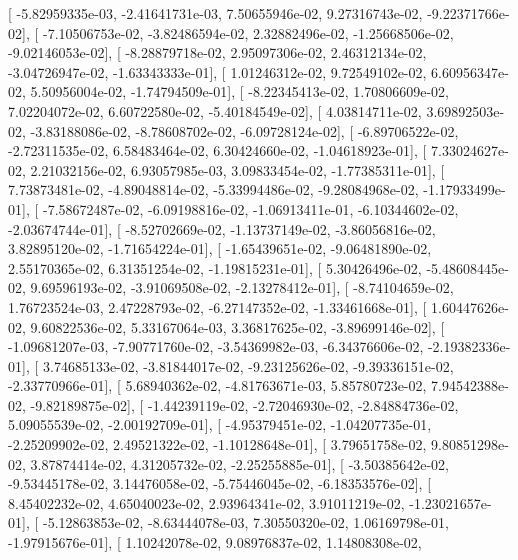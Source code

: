 \documentclass{article}
\begin{document}
       [ -5.82959335e-03,  -2.41641731e-03,   7.50655946e-02,
          9.27316743e-02,  -9.22371766e-02],
       [ -7.10506753e-02,  -3.82486594e-02,   2.32882496e-02,
         -1.25668506e-02,  -9.02146053e-02],
       [ -8.28879718e-02,   2.95097306e-02,   2.46312134e-02,
         -3.04726947e-02,  -1.63343333e-01],
       [  1.01246312e-02,   9.72549102e-02,   6.60956347e-02,
          5.50956004e-02,  -1.74794509e-01],
       [ -8.22345413e-02,   1.70806609e-02,   7.02204072e-02,
          6.60722580e-02,  -5.40184549e-02],
       [  4.03814711e-02,   3.69892503e-02,  -3.83188086e-02,
         -8.78608702e-02,  -6.09728124e-02],
       [ -6.89706522e-02,  -2.72311535e-02,   6.58483464e-02,
          6.30424660e-02,  -1.04618923e-01],
       [  7.33024627e-02,   2.21032156e-02,   6.93057985e-03,
          3.09833454e-02,  -1.77385311e-01],
       [  7.73873481e-02,  -4.89048814e-02,  -5.33994486e-02,
         -9.28084968e-02,  -1.17933499e-01],
       [ -7.58672487e-02,  -6.09198816e-02,  -1.06913411e-01,
         -6.10344602e-02,  -2.03674744e-01],
       [ -8.52702669e-02,  -1.13737149e-02,  -3.86056816e-02,
          3.82895120e-02,  -1.71654224e-01],
       [ -1.65439651e-02,  -9.06481890e-02,   2.55170365e-02,
          6.31351254e-02,  -1.19815231e-01],
       [  5.30426496e-02,  -5.48608445e-02,   9.69596193e-02,
         -3.91069508e-02,  -2.13278412e-01],
       [ -8.74104659e-02,   1.76723524e-03,   2.47228793e-02,
         -6.27147352e-02,  -1.33461668e-01],
       [  1.60447626e-02,   9.60822536e-02,   5.33167064e-03,
          3.36817625e-02,  -3.89699146e-02],
       [ -1.09681207e-03,  -7.90771760e-02,  -3.54369982e-03,
         -6.34376606e-02,  -2.19382336e-01],
       [  3.74685133e-02,  -3.81844017e-02,  -9.23125626e-02,
         -9.39336151e-02,  -2.33770966e-01],
       [  5.68940362e-02,  -4.81763671e-03,   5.85780723e-02,
          7.94542388e-02,  -9.82189875e-02],
       [ -1.44239119e-02,  -2.72046930e-02,  -2.84884736e-02,
          5.09055539e-02,  -2.00192709e-01],
       [ -4.95379451e-02,  -1.04207735e-01,  -2.25209902e-02,
          2.49521322e-02,  -1.10128648e-01],
       [  3.79651758e-02,   9.80851298e-02,   3.87874414e-02,
          4.31205732e-02,  -2.25255885e-01],
       [ -3.50385642e-02,  -9.53445178e-02,   3.14476058e-02,
         -5.75446045e-02,  -6.18353576e-02],
       [  8.45402232e-02,   4.65040023e-02,   2.93964341e-02,
          3.91011219e-02,  -1.23021657e-01],
       [ -5.12863853e-02,  -8.63444078e-03,   7.30550320e-02,
          1.06169798e-01,  -1.97915676e-01],
       [  1.10242078e-02,   9.08976837e-02,   1.14808308e-02,
\end{document}
